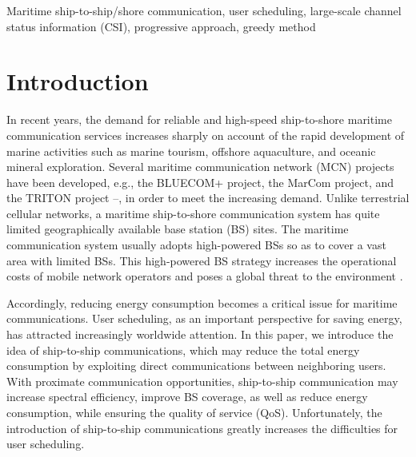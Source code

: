 \documentclass[conference]{IEEEtran}
\begin{document}
\begin{IEEEkeywords}
Maritime ship-to-ship/shore communication, user scheduling, large-scale channel status information (CSI), progressive approach, greedy method
\end{IEEEkeywords}


\maketitle

\section{Introduction}\label{sec:1}
In recent years, the demand for reliable and high-speed ship-to-shore maritime communication services increases sharply on account of the rapid development of marine activities such as marine tourism, offshore aquaculture, and oceanic mineral exploration. Several maritime communication network (MCN) projects have been developed, e.g., the BLUECOM+ project, the MarCom project, and the TRITON project \cite{p321}--\cite{p32}, in order to meet the increasing demand. 
Unlike terrestrial cellular networks, a maritime ship-to-shore communication system has quite limited geographically available base station (BS) sites. The maritime communication system usually adopts high-powered BSs so as to cover a vast area with limited BSs. This high-powered BS strategy increases the operational costs of mobile network operators and poses a global threat to the environment \cite{p33}.

Accordingly, reducing energy consumption becomes a critical issue for maritime communications. User scheduling, as an important perspective for saving energy, has attracted increasingly worldwide attention. 
In this paper, we introduce the idea of ship-to-ship communications, which %
may reduce the total energy consumption by exploiting direct communications between neighboring users. With proximate communication opportunities, ship-to-ship communication may increase spectral efficiency, improve BS coverage, as well as reduce energy consumption, while ensuring the quality of service (QoS). Unfortunately, the introduction of ship-to-ship communications greatly increases the difficulties for user scheduling. 
\end{document}

